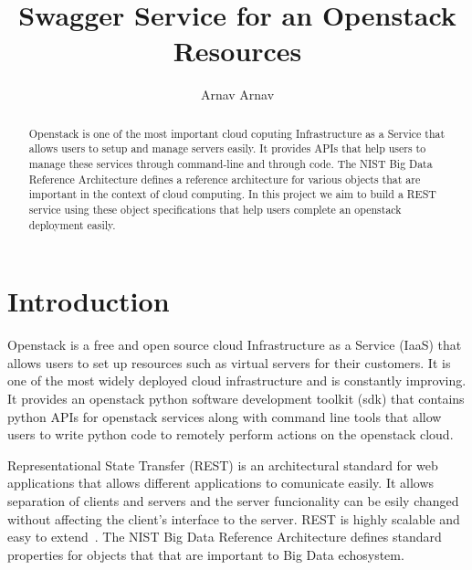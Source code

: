 
\title{Swagger Service for an Openstack Resources}


\author{Arnav Arnav}


\renewcommand{\shortauthors}{Arnav}


\begin{abstract}
Openstack is one of the most important cloud coputing Infrastructure
as a Service that allows users to setup and manage servers easily. It
provides APIs that help users to manage these services through
command-line and through code. The NIST Big Data Reference
Architecture defines a reference architecture for various objects that
are important in the context of cloud computing. In this project we
aim to build a REST service using these object specifications that
help users complete an openstack deployment easily.
\end{abstract}



\maketitle

\section{Introduction}
Openstack is a free and open source cloud Infrastructure as a Service
(IaaS) that allows users to set up resources such as virtual servers for
their customers. It is one of the most widely deployed cloud
infrastructure and is constantly improving. It provides an openstack
python software development toolkit (sdk) that contains python APIs
for openstack services along with command line tools that allow users
to write python code to remotely perform actions on the openstack
cloud.

Representational State Transfer (REST) is an architectural standard
for web applications that allows different applications to comunicate
easily. It allows separation of clients and servers and the server
funcionality can be esily changed without affecting the client's
interface to the server. REST is highly scalable and easy to
extend~\cite{hid-sp18-503-REST}. The NIST Big Data Reference
Architecture defines standard properties for objects that that are
important to Big Data echosystem.

